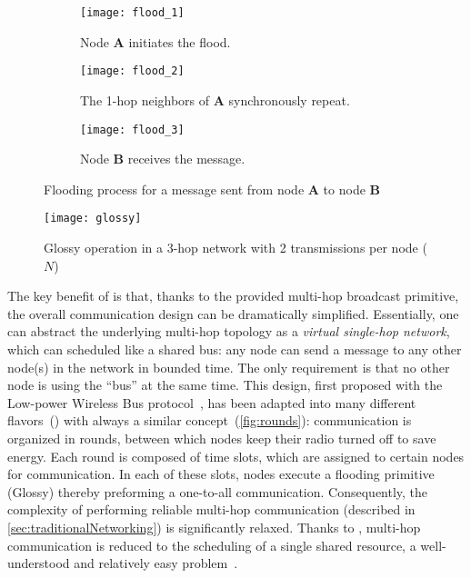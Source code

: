 \begin{figure}
  \centering
	\captionsetup[subfigure]{labelformat=empty,justification=centering}
  \begin{subfigure}[t]{0.3\linewidth}
      \centering
      \texttt{[image: flood\_1]}
			\caption{Node \textbf{A} initiates the flood.}
      \label{fig:flooding1}
  \end{subfigure}%
  \hfill
  \begin{subfigure}[t]{0.33\linewidth}
      \centering
      \texttt{[image: flood\_2]}
			\caption{The 1-hop neighbors of \textbf{A} synchronously repeat.}
      \label{fig:flooding2}
  \end{subfigure}%
  \hfill
  \begin{subfigure}[t]{0.33\linewidth}
      \centering
      \texttt{[image: flood\_3]}
			\caption{Node \textbf{B} receives the message.}
      \label{fig:flooding3}
  \end{subfigure}
  \caption{%
  Flooding process for a message sent from node \textbf{A} to node \textbf{B}}
  \label{fig:flooding}
\end{figure}

\begin{figure}
  \centering
  \texttt{[image: glossy]}
  \caption{Glossy operation in a 3-hop network with 2 transmissions per node ($N$)}
  \label{fig:glossy}
	\vspace{-0.2cm}
\end{figure}


The key benefit of \ST is that, thanks to the provided multi-hop broadcast primitive, the overall communication design can be dramatically simplified.
Essentially, one can abstract the underlying multi-hop topology as a \emph{virtual single-hop network}, which can scheduled like a shared bus: any node can send a message to any other node(s) in the network in bounded time. The only requirement is that no other node is using the ``bus'' at the same time.
This design, first proposed with the Low-power Wireless Bus protocol~\cite{ferrari2012LWB}, has been adapted into many different flavors~(\eg \cite{istomin2018Interferenceresilient, alnahas2017a2, sarkar2016Sleeping, baddeley2019AtomicSDN}) with always a similar concept~(\cref{fig:rounds}): communication is organized in rounds, between which nodes keep their radio turned off to save energy. Each round is composed of time slots, which are assigned to certain nodes for communication. In each of these slots, nodes execute a flooding primitive (\eg Glossy) thereby preforming a one-to-all communication.
Consequently, the complexity of performing reliable multi-hop communication (described in \cref{sec:traditionalNetworking}) is significantly relaxed.
Thanks to \ST, multi-hop communication is reduced to the scheduling of a single shared resource, a well-understood and relatively easy problem~\cite{buttazzo2011HardRT}.

